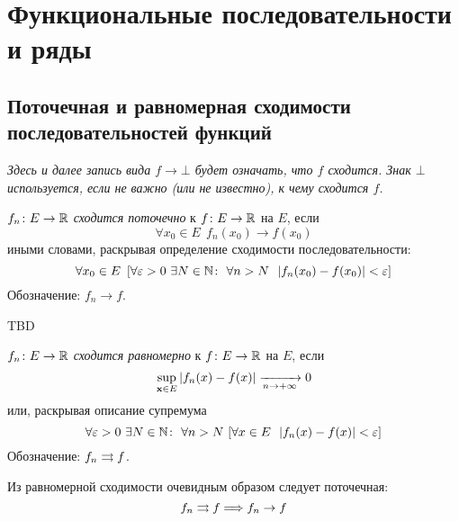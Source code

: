 \chapter{Функциональные последовательности и ряды}

\section{Поточечная и равномерная сходимости последовательностей функций}

\begin{remark}
    \textit{Здесь и далее запись вида $f \to \bot$ будет означать, что $f$
    сходится. Знак $\bot$ используется, если не важно (или не известно), к чему
    сходится $f$.}
\end{remark}

\begin{definition}
    $f_n \colon E \to \mathbb{R}$ \textit{сходится поточечно} к $f \colon E \to \mathbb{R}$ на
    $E$, если
\[
    \forall x_0 \in E~~ f_n(x_0) \to f(x_0)
\]
    иными словами, раскрывая определение сходимости последовательности:
\[
    \forall x_0 \in E~ \left[ \forall \varepsilon > 0~ \exists N \in \mathbb{N}\colon~
    \forall n > N~~ |f_n(x_0) - f(x_0)| < \varepsilon \right]
\]
    Обозначение: $f_n \to f$.
\end{definition}

\begin{examples}
    TBD
\end{examples}

\begin{definition}
    $f_n \colon E \to \mathbb{R}$ \textit{сходится равномерно} к $f \colon E \to \mathbb{R}$ на
    $E$, если
\[
    \sup_{\mathbf{x} \in E}|f_n(x) - f(x)| \xrightarrow[n \to +\infty]{} 0
\]
    или, раскрывая описание супремума
\[
    \forall \varepsilon > 0~ \exists N \in \mathbb{N}\colon~ \forall n > N~ [\forall x \in
    E~~ |f_n(x) - f(x)| < \varepsilon]
\]
    Обозначение: $f_n \rightrightarrows f$.
\end{definition}

\begin{remark}
    Из равномерной сходимости очевидным образом следует поточечная:
\[
    f_n \rightrightarrows f \Longrightarrow f_n \to f
\]
\end{remark}

